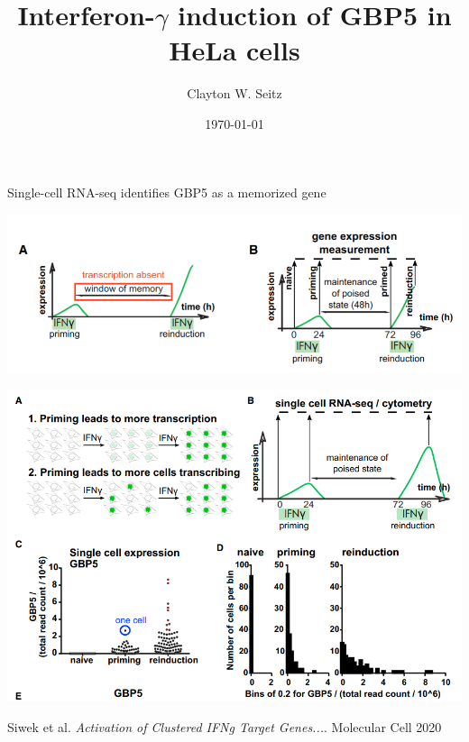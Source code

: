 \documentclass{beamer}					%
\title{Interferon-$\gamma$ induction of GBP5 in HeLa cells}	%
\author{Clayton W. Seitz}								%
\date{\today}									%
\begin{document}
\begin{frame}
  \titlepage
\end{frame}


%

\begingroup
{}
\begin{frame}{Single-cell RNA-seq identifies GBP5 as a memorized gene}
\begin{center}
\includegraphics[width=1\textwidth]{Memory.png}
\end{center}
\begin{center}
\includegraphics[width=1\textwidth]{Seq.png}
\end{center}
Siwek et al. \textit{Activation of Clustered IFNg Target Genes...}. Molecular Cell 2020
\end{frame}
\endgroup
\end{document}

